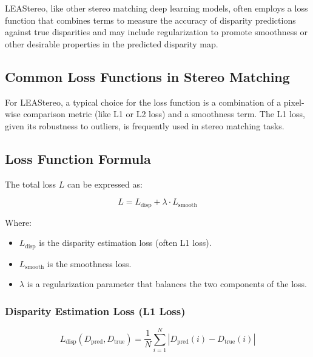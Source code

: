 \documentclass[22pt]{report}
\begin{document}

\vspace{15}
LEAStereo, like other stereo matching deep learning models, often employs a loss function that combines terms to measure the accuracy of disparity predictions against true disparities and may include regularization to promote smoothness or other desirable properties in the predicted disparity map.\\
\subsection{Common Loss Functions in Stereo Matching}
For LEAStereo, a typical choice for the loss function is a combination of a pixel-wise comparison metric (like L1 or L2 loss) and a smoothness term. The L1 loss, given its robustness to outliers, is frequently used in stereo matching tasks.
\subsection*{Loss Function Formula}
The total loss \( L \) can be expressed as:
\begin{center}
        \[
        L = L_{\text{disp}} + \lambda \cdot L_{\text{smooth}}
        \]
\end{center}    
Where:
\begin{itemize}
    \item \( L_{\text{disp}} \) is the disparity estimation loss (often L1 loss). \\
    \item \( L_{\text{smooth}} \) is the smoothness loss. \\
    \item \( \lambda \) is a regularization parameter that balances the two components of the loss.
\end{itemize}
\subsubsection{Disparity Estimation Loss (L1 Loss)}
\begin{center}
     \[
        L_{\text{disp}}(D_{\text{pred}}, D_{\text{true}}) = \frac{1}{N} \sum_{i=1}^{N} \left| D_{\text{pred}}(i) - D_{\text{true}}(i) \right|
     \]
\end{center}
\end{document}

